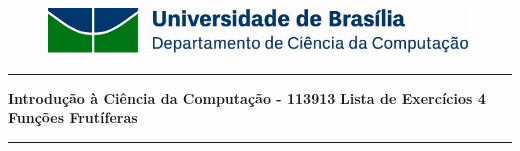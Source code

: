 \documentclass[a4paper, 12pt]{article}
\begin{document}
\begin{figure}[H]
	\includegraphics[scale=0.9]{UnB_CiC_Logo.jpg}
\end{figure}
\noindent\rule{\textwidth}{0.4pt}
\begin{center}
	\textbf{{\Large Introdução à Ciência da Computação - 113913}} \newline \newline
	\textbf{{\large Lista de Exercícios 4} \\
	\vspace{9pt}
	{\large Funções Frutíferas}} \\
	\noindent\rule{\textwidth}{0.4pt}
	\newline
\end{center}
\end{document}
